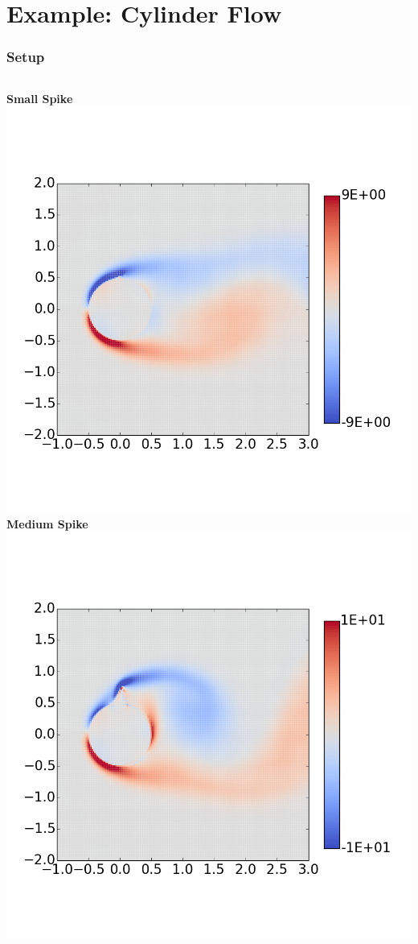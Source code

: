 \documentclass[9pt]{beamer}
\begin{document}
\section{Example: Cylinder Flow}
\label{sec-3}
\begin{frame}
\frametitle{Setup}
\label{sec-3-1}

\begin{columns}[c]
   \centering
    \textbf{Small Spike} \\
    \includegraphics[width=1\textwidth]{PerturbSmallHorn}
   \centering
    \textbf{Medium Spike} \\
    \includegraphics[width=1\textwidth]{PerturbMediumHorn}

\end{columns}
\end{frame}
\end{document}
